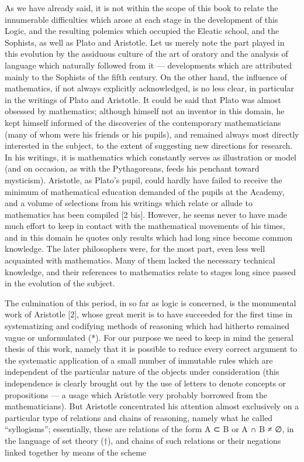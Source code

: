 As we have already said, it is not within the scope of this book to relate the innumerable difficulties which arose at each stage in the development of this Logic, and the resulting polemics which occupied the Eleatic school, and the Sophists, as well as Plato and Aristotle. Let us merely note the part played in this evolution by the assiduous culture of the art of oratory and the analysis of language which naturally followed from it --- developments which are attributed mainly to the Sophists of the fifth century. On the other hand, the influence of mathematics, if not always explicitly acknowledged, is no less clear, in particular in the writings of Plato and Aristotle. It could be said that Plato was almost obsessed by mathematics; although himself not an inventor in this domain, he kept himself informed of the discoveries of the contemporary mathematicians (many of whom were his friends or his pupils), and remained always most directly interested in the subject, to the extent of suggesting new directions for research. In his writings, it is mathematics which constantly serves as illustration or model (and on occasion, as with the Pythagoreans, feeds his penchant toward mysticism). Aristotle, as Plato's pupil, could hardly have failed to receive the minimum of mathematical education demanded of the pupils at the Academy, and a volume of selections from his writings which relate or allude to mathematics has been compiled {[}2 bis{]}. However, he seems never to have made much effort to keep in contact with the mathematical movements of his times, and in this domain he quotes only results which had long since become common knowledge. The later philosophers were, for the most part, even less well acquainted with mathematics. Many of them lacked the necessary technical knowledge, and their references to mathematics relate to stages long since passed in the evolution of the subject.

The culmination of this period, in so far as logic is concerned, is the monumental work of Aristotle {[}2{]}, whose great merit is to have succeeded for the first time in systematizing and codifying methods of reasoning which had hitherto remained vague or unformulated (*). For our purpose we need to keep in mind the general thesis of this work, namely that it is possible to reduce every correct argument to the systematic application of a small number of immutable rules which are independent of the particular nature of the objects under consideration (this independence is clearly brought out by the use of letters to denote concepts or propositions --- a usage which Aristotle very probably borrowed from the mathematicians). But Aristotle concentrated his attention almost exclusively on a particular type of relations and chains of reasoning, namely what he called ``syllogisms''; essentially, these are relations of the form A ⊂ B or A ∩ B ≠ ∅, in the language of set theory (†), and chains of such relations or their negations linked together by means of the scheme

